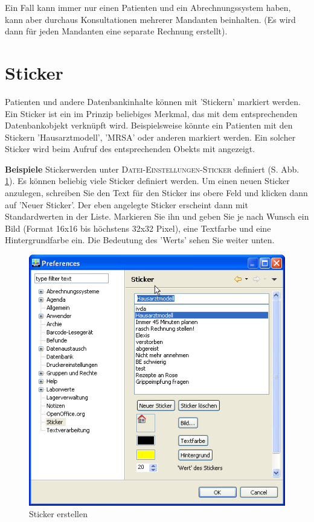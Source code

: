 Ein Fall kann immer nur einen Patienten und ein Abrechnungssystem haben, kann aber durchaus  Konsultationen mehrerer Mandanten beinhalten. (Es wird dann für jeden Mandanten eine separate Rechnung erstellt).

\section{Sticker}
\label{Etiketten}
Patienten und andere Datenbankinhalte können mit 'Stickern' markiert werden. Ein Sticker ist ein im Prinzip beliebiges Merkmal, das mit dem entsprechenden Datenbankobjekt verknüpft wird. Beispielsweise könnte ein Patienten mit den Stickern 'Hausarztmodell', 'MRSA' oder anderen markiert werden. Ein solcher Sticker wird beim Aufruf des entsprechenden Obekts mit angezeigt.

\textbf{Beispiele}
 Stickerwerden unter \textsc{Datei-Einstellungen-Sticker} definiert (S. Abb. \ref{fig:etiketten1}). Es können beliebig viele Sticker definiert werden. Um einen neuen Sticker anzulegen, schreiben Sie den Text für den Sticker ins obere Feld und klicken dann auf 'Neuer Sticker'. Der eben angelegte Sticker erscheint dann mit Standardwerten in der Liste. Markieren Sie ihn und geben Sie je nach Wunsch ein Bild (Format 16x16 bis höchstens 32x32 Pixel), eine Textfarbe und eine Hintergrundfarbe ein. Die Bedeutung des 'Werts' sehen Sie weiter unten.

\begin{figure}
    \includegraphics{images/etikette1}
    \caption{Sticker erstellen}
    \label{fig:etiketten1}
\end{figure}

